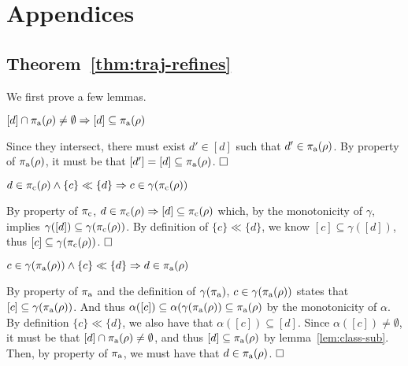 \section{Appendices}

\subsection{Theorem~\ref{thm:traj-refines}}

We first prove a few lemmas.

\begin{lemma} \label{lem:class-sub}
$[d] \cap \operatorname{\pi_{\textrm{a}}}(\rho) \neq \emptyset \Rightarrow [d] \subseteq \operatorname{\pi_{\textrm{a}}}(\rho)$
\end{lemma}

Since they intersect, there must exist $d' \in [d]$ such that $d' \in \operatorname{\pi_{\textrm{a}}}(\rho)$. By property  of $\operatorname{\pi_{\textrm{a}}}(\rho)$, it must be that $[d'] = [d] \subseteq \operatorname{\pi_{\textrm{a}}}(\rho)$. $\qedbox$

\begin{lemma} \label{lem:traj-con}
$d \in \operatorname{\pi_{\textrm{c}}}(\rho) \wedge \{ c \} \ll \{ d \} \Rightarrow c \in \gamma(\operatorname{\pi_{\textrm{c}}}(\rho))$
\end{lemma}

By property  of $\operatorname{\pi_{\textrm{c}}}$, $d \in \operatorname{\pi_{\textrm{c}}}(\rho) \Rightarrow [d] \subseteq \operatorname{\pi_{\textrm{c}}}(\rho)$ which, by the monotonicity of $\gamma$, implies $\gamma([d]) \subseteq \gamma(\operatorname{\pi_{\textrm{c}}}(\rho))$. By definition of $\{ c \} \ll \{ d \}$, we know $[c] \subseteq \gamma([d])$, thus $[c] \subseteq \gamma(\operatorname{\pi_{\textrm{c}}}(\rho))$. $\qedbox$

\begin{lemma} \label{lem:traj-ant}
$c \in \gamma(\operatorname{\pi_{\textrm{a}}}(\rho)) \wedge \{ c \} \ll \{ d \} \Rightarrow d \in \operatorname{\pi_{\textrm{a}}}(\rho)$
\end{lemma}

By property  of $\operatorname{\pi_{\textrm{a}}}$ and the definition of $\gamma(\operatorname{\pi_{\textrm{a}}})$, $c \in \gamma(\operatorname{\pi_{\textrm{a}}}(\rho))$ states that $[c] \subseteq \gamma(\operatorname{\pi_{\textrm{a}}}(\rho))$. And thus $\alpha([c]) \subseteq \alpha(\gamma(\operatorname{\pi_{\textrm{a}}}(\rho)) \subseteq \operatorname{\pi_{\textrm{a}}}(\rho)$ by the monotonicity of $\alpha$. By definition $\{ c \} \ll \{ d \}$, we also have that $\alpha([c]) \subseteq [d]$. Since $\alpha([c]) \neq \emptyset$, it must be that $[d] \cap \operatorname{\pi_{\textrm{a}}}(\rho) \neq \emptyset$, and thus $[d] \subseteq \operatorname{\pi_{\textrm{a}}}(\rho)$ by lemma~\ref{lem:class-sub}. Then, by property  of $\operatorname{\pi_{\textrm{a}}}$, we must have that $d \in \operatorname{\pi_{\textrm{a}}}(\rho)$. $\qedbox$
\\

